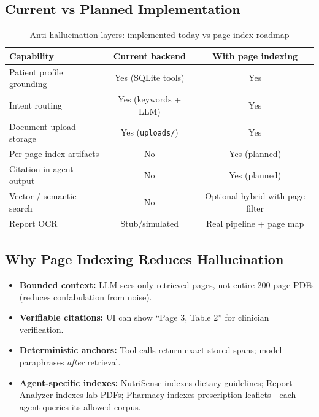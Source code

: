\documentclass[12pt,a4paper]{article}
\begin{document}
\subsection{Current vs Planned Implementation}

\begin{table}[H]
\centering
\renewcommand{\arraystretch}{1.35}
\begin{tabularx}{\textwidth}{lcc}
\toprule
\textbf{Capability} & \textbf{Current backend} & \textbf{With page indexing} \\
\midrule
Patient profile grounding & Yes (SQLite tools) & Yes \\
Intent routing            & Yes (keywords + LLM) & Yes \\
Document upload storage   & Yes (\texttt{uploads/}) & Yes \\
Per-page index artifacts  & No & Yes (planned) \\
Citation in agent output  & No & Yes (planned) \\
Vector / semantic search  & No & Optional hybrid with page filter \\
Report OCR                & Stub/simulated & Real pipeline + page map \\
\bottomrule
\end{tabularx}
\caption{Anti-hallucination layers: implemented today vs page-index roadmap}
\end{table}

\subsection{Why Page Indexing Reduces Hallucination}

\begin{itemize}[noitemsep]
    \item \textbf{Bounded context:} LLM sees only retrieved pages, not entire 200-page PDFs (reduces confabulation from noise).
    \item \textbf{Verifiable citations:} UI can show ``Page 3, Table 2'' for clinician verification.
    \item \textbf{Deterministic anchors:} Tool calls return exact stored spans; model paraphrases \emph{after} retrieval.
    \item \textbf{Agent-specific indexes:} NutriSense indexes dietary guidelines; Report Analyzer indexes lab PDFs; Pharmacy indexes prescription leaflets---each agent queries its allowed corpus.
\end{itemize}
\end{document}
